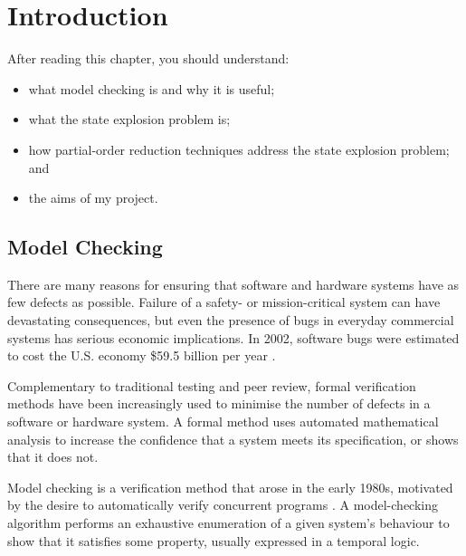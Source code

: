 \documentclass[12pt,a4paper,twoside,openany]{report}
\newenvironment{understandinglist}
	{\begin{itemize} \itemsep 0em}{\end{itemize}}
\begin{document}
\setcounter{tocdepth}{1} %
\tableofcontents


\pagestyle{headings}

\chapter{Introduction}
After reading this chapter,
you should understand:
\begin{understandinglist}
	\item what model checking is and why it is useful;
	\item what the state explosion problem is;
	\item how partial-order reduction
	techniques address the state explosion problem; and
	\item the aims of my project.
\end{understandinglist}

\section{Model Checking}

There are many reasons for ensuring that
software and hardware systems have as
few defects as possible. Failure of a
safety- or mission-critical system can
have devastating consequences, but even the
presence of bugs in everyday commercial systems has
serious economic implications. In 2002,
software bugs were estimated to cost
the U.S. economy \$59.5 billion per year \cite{tass02}.

Complementary to traditional testing
and peer review, formal verification methods have been
increasingly used
to minimise the number of defects in a
software or hardware system. A formal
method uses automated
mathematical analysis to increase
the confidence that a system meets its
specification, or shows that it does not.

Model checking is a verification method
that arose in the early 1980s,
motivated by the desire to automatically
verify concurrent programs \cite{cla08}.
A model-checking algorithm performs
an exhaustive enumeration of a given
system's behaviour to show that it
satisfies some property, usually
expressed in a temporal logic.
\end{document}
